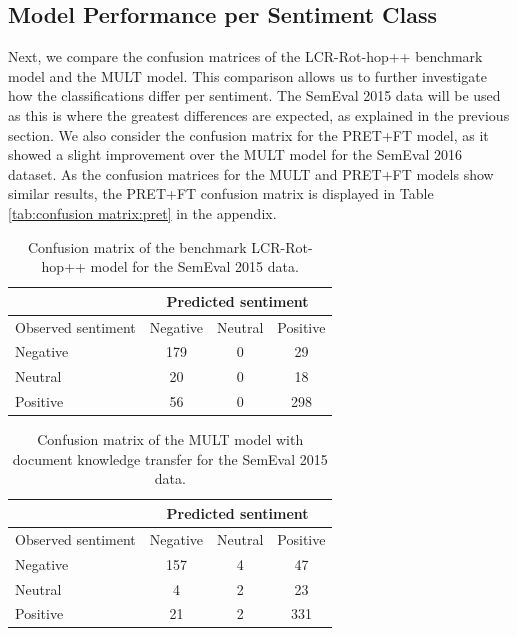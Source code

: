 \documentclass[runningheads]{llncs}
\begin{document}
\subsection{Model Performance per Sentiment Class}
Next, we compare the confusion matrices of the LCR-Rot-hop++ benchmark model and the MULT model. This comparison allows us to further investigate how the classifications differ per sentiment. The SemEval 2015 data will be used as this is where the greatest differences are expected, as explained in the previous section. We also consider the confusion matrix for the PRET+FT model, as it showed a slight improvement over the MULT model for the SemEval 2016 dataset. As the confusion matrices for the MULT and PRET+FT models show similar results, the PRET+FT confusion matrix is displayed in Table \ref{tab:confusion matrix:pret} in the appendix. 
\begin{table}[h]
\caption{Confusion matrix of the benchmark LCR-Rot-hop++ model for the SemEval 2015 data.}
\label{tab:confusion matrix LCR}
\setlength{\tabcolsep}{28.3pt}
\begin{tabular}{@{}lccc@{}}
\toprule
                   & \multicolumn{3}{c}{Predicted sentiment} \\ \midrule
Observed sentiment & Negative     & Neutral    & Positive    \\ \midrule
Negative           & 179          & 0          & 29          \\
Neutral            & 20           & 0          & 18          \\
Positive           & 56           & 0          & 298         \\ \bottomrule
\end{tabular}
\vspace{-5mm}
\end{table}
\begin{table}[h]
\caption{Confusion matrix of the MULT model with document knowledge transfer for the SemEval 2015 data.}
\label{tab:confusion matrix:mult}
\setlength{\tabcolsep}{28.3pt}
\begin{tabular}{@{}lccc@{}}
\toprule
                   & \multicolumn{3}{c}{Predicted sentiment} \\ \midrule
Observed sentiment & Negative     & Neutral    & Positive    \\ \midrule
Negative           & 157          & 4          & 47          \\
Neutral            & 4           & 2          & 23          \\
Positive           & 21           & 2          & 331         \\ \bottomrule
\end{tabular}
\end{table}
\end{document}

